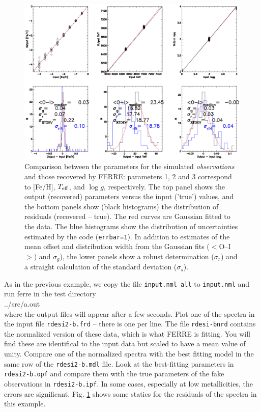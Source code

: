 \documentclass[12pt]{article}
\begin{document}
\begin{figure}[t!]
\includegraphics[width=14cm]{f1.ps}
\caption{Comparison between the parameters for the simulated {\it observations}
and those recovered by FERRE: parameters  1, 2 and  3 correspond to [Fe/H], 
$T_{\rm eff}$, and $\log g$, respectively. 
The top panel shows the output (recovered) %
parameters versus the input ('true') values, and the bottom panels show (black 
histograms) the distribution of residuals (recovered -- true). The red curves  
are Gaussian fitted to the data. The blue histograms show the distribution of 
uncertainties estimated by the code ({\tt errbar=1}). In addition to estimates 
of the mean offset and distribution width from the Gaussian fits ($<$O--I$>$) 
and $\sigma_g$), the lower panels show a robust determination ($\sigma_r$) and 
a straight calculation of the standard deviation ($\sigma_{s}$).
\label{f1}
}
\end{figure}

As in the previous example, we copy the file {\tt input.nml\_all} to {\tt input.nml} 
and run ferre in the test directory \\
../src/a.out \\
where the output files will appear after a few seconds. Plot one of the spectra
in the input file {\tt rdesi2-b.frd} -- there is one per line. The file {\tt rdesi-bnrd} contains the normalized version of these data, which is what FERRE is fitting. You will 
find these are identifical to the input data but scaled to have a mean value of unity.  
Compare one of the normalized spectra  with 
the best fitting model in the same row of the {\tt rdesi2-b.mdl} file. 
Look at  the best-fitting parameters in {\tt rdesi2-b.opf} and compare 
them with the true parameters of the fake observations in {\tt rdesi2-b.ipf}. 
In some cases, especially at low metallicities, the errors are significant.
Fig. \ref{f1} shows some statics for the residuals of the spectra in this example.
\end{document}
